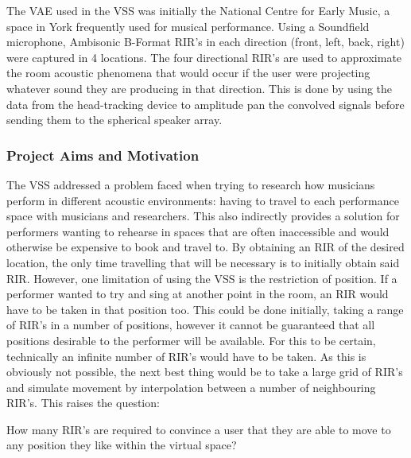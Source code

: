 \documentclass[../../main.tex]{subfiles}
\begin{document}
		The \ac{VAE} used in the \ac{VSS} was initially the National Centre for Early Music, a space in York frequently used for musical performance. Using a Soundfield microphone, Ambisonic B-Format \ac{RIR}'s in each direction (front, left, back, right) were captured in 4 locations. The four directional \ac{RIR}'s are used to approximate the room acoustic phenomena that would occur if the user were projecting whatever sound they are producing in that direction. This is done by using the data from the head-tracking device to amplitude pan the convolved signals before sending them to the spherical speaker array.


	\subsubsection{Project Aims and Motivation}
	\label{background:aims}
		
		The \ac{VSS} addressed a problem faced when trying to research how musicians perform in different acoustic environments: having to travel to each performance space with musicians and researchers. This also indirectly provides a solution for performers wanting to rehearse in spaces that are often inaccessible and would otherwise be expensive to book and travel to. By obtaining an \ac{RIR} of the desired location, the only time travelling that will be necessary is to initially obtain said \ac{RIR}. However, one limitation of using the \ac{VSS} is the restriction of position. If a performer wanted to try and sing at another point in the room, an \ac{RIR} would have to be taken in that position too. This could be done initially, taking a range of \ac{RIR}'s in a number of positions, however it cannot be guaranteed that all positions desirable to the performer will be available. For this to be certain, technically an infinite number of \ac{RIR}'s would have to be taken. As this is obviously not possible, the next best thing would be to take a large grid of \ac{RIR}'s and simulate movement by interpolation between a number of neighbouring \ac{RIR}'s. This raises the question:



		 \vspace{5mm}
		 \begin{center}
		 \begin{minipage}{0.7\textwidth}
		 How many \ac{RIR}'s are required to convince a user that they are able to move to any position they like within the virtual space?
		 \end{minipage}
		 \end{center}
		 \vspace{5mm}
\end{document}
